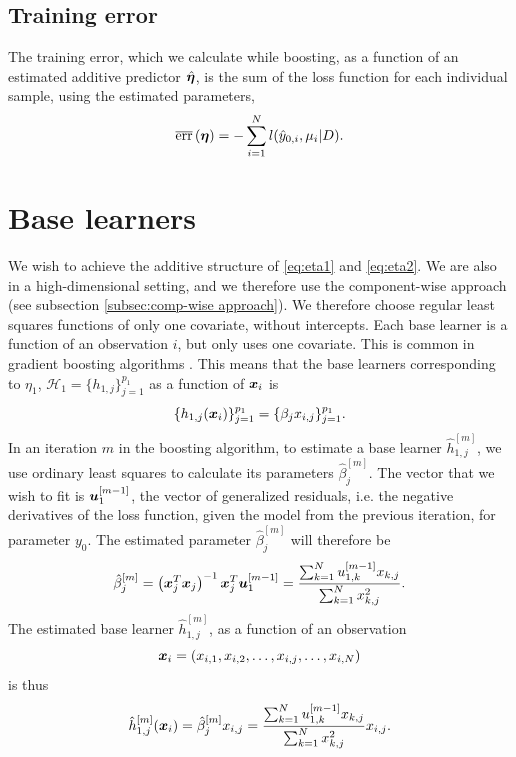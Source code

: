 \subsection{Training error}
The training error, which we calculate while boosting, as a function of an estimated additive predictor $\hat{\boldsymbol{\eta}}$, is the sum of the loss function for each individual sample, using the estimated parameters,
\begin{equation}
\label{eq:training-error-fht}
\overline{\text{err}}\left(\boldsymbol{\eta}\right)=-\sum_{i=1}^N l(\hat{y}_{0,i},\mu_i|D).
\end{equation}

\section{Base learners}
We wish to achieve the additive structure of \eqref{eq:eta1} and \eqref{eq:eta2}.
We are also in a high-dimensional setting, and we therefore use the component-wise approach (see subsection \ref{subsec:comp-wise approach}).
We therefore choose regular least squares functions of only one covariate, without intercepts.
Each base learner is a function of an observation $i$, but only uses one covariate.
This is common in gradient boosting algorithms \citep[see]{mayr14a}.
This means that the base learners corresponding to $\eta_1$, $\mathcal{H}_1=\{h_{1,j}\}_{j=1}^{p_1}$ as a function of $\bm{x}_i$ is
\begin{equation*}
    \{h_{1,j}(\bm{x}_i)\}_{j=1}^{p_1}=\{\beta_jx_{i,j}\}_{j=1}^{p_1}.
\end{equation*}
In an iteration $m$ in the boosting algorithm, to estimate a base learner $\hat{h}_{1,j}^{[m]}$, we use ordinary least squares to calculate its parameters $\hat{\beta}_j^{[m]}$.
The vector that we wish to fit is $\bm{u}_1^{[m-1]}$, the vector of generalized residuals, i.e. the negative derivatives of the loss function, given the model from the previous iteration, for parameter $y_0$.
The estimated parameter $\hat{\beta}_j^{[m]}$ will therefore be
\begin{equation*}
    \hat{\beta}_j^{[m]}=\left(\bm{x}_j^T\bm{x}_j\right)^{-1}\bm{x}_j^T \bm{u}_1^{[m-1]}=\frac{\sum_{k=1}^N u_{1,k}^{[m-1]}x_{k,j}}{\sum_{k=1}^N x_{k,j}^2}.
\end{equation*}
The estimated base learner $\hat{h}_{1,j}^{[m]}$, as a function of an observation
\begin{equation}
    \bm{x}_i=(x_{i,1},x_{i,2},\ldots,x_{i,j},\ldots,x_{i,N})
\end{equation}
is thus
\begin{equation*}
    \hat{h}_{1,j}^{[m]}(\bm{x}_i)=\hat{\beta}_j^{[m]}x_{i,j}=\frac{\sum_{k=1}^N u_{1,k}^{[m-1]}x_{k,j}}{\sum_{k=1}^N x_{k,j}^2}x_{i,j}.
\end{equation*}
